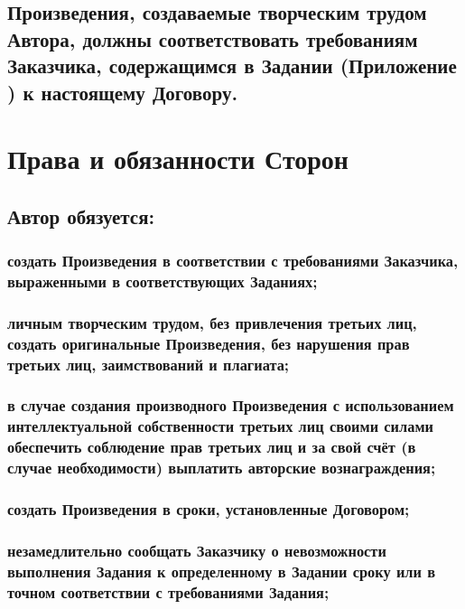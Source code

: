 \documentclass[12pt]{article}
\begin{document}
\subsection{Произведения, создаваемые творческим трудом Автора, должны соответствовать требованиям Заказчика, содержащимся в Задании (Приложение ) к настоящему Договору.}

\section{Права и обязанности Сторон}

\subsection{Автор обязуется:}

\subsubsection{создать Произведения в соответствии с требованиями Заказчика, выраженными в соответствующих Заданиях;}

\subsubsection{личным творческим трудом, без привлечения третьих лиц, создать оригинальные Произведения, без нарушения прав третьих лиц, заимствований и плагиата;}

\subsubsection{в случае создания производного Произведения с использованием интеллектуальной собственности третьих лиц своими силами обеспечить соблюдение прав третьих лиц и за свой счёт (в случае необходимости) выплатить авторские вознаграждения;}

\subsubsection{создать Произведения в сроки, установленные Договором;}

\subsubsection{незамедлительно сообщать Заказчику о невозможности выполнения Задания к определенному в Задании сроку или в точном соответствии с требованиями Задания;}
\end{document}
